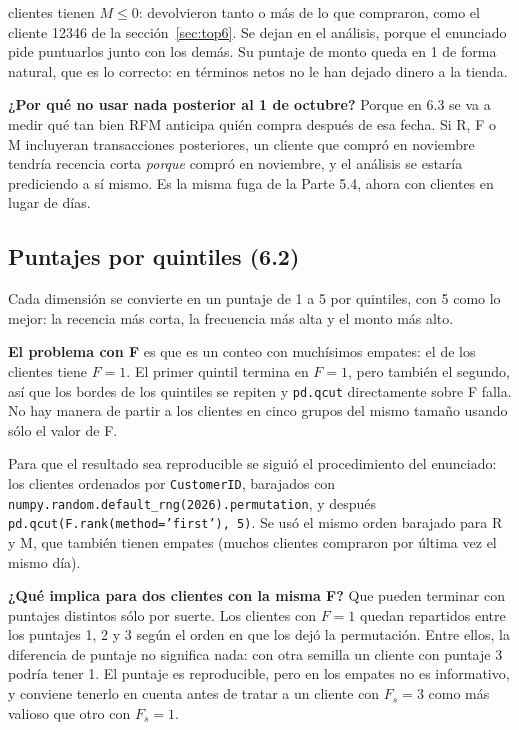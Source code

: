 \documentclass[11pt,letterpaper]{article}
\newcommand{\code}[1]{\texttt{#1}}
\newenvironment{respuesta}{\par\medskip}{\par\medskip}
\begin{document}
\ClientesMneg{} clientes tienen \textbf{$M\le0$}: devolvieron tanto o más de
lo que compraron, como el cliente 12346 de la sección~\ref{sec:top6}. Se
dejan en el análisis, porque el enunciado pide puntuarlos junto con los
demás. Su puntaje de monto queda en 1 de forma natural, que es lo correcto:
en términos netos no le han dejado dinero a la tienda.

\begin{respuesta}
\textbf{¿Por qué no usar nada posterior al 1 de octubre?} Porque en 6.3 se
va a medir qué tan bien RFM anticipa quién compra después de esa fecha. Si R,
F o M incluyeran transacciones posteriores, un cliente que compró en
noviembre tendría recencia corta \emph{porque} compró en noviembre, y el
análisis se estaría prediciendo a sí mismo. Es la misma fuga de la Parte
5.4, ahora con clientes en lugar de días.
\end{respuesta}

\subsection{Puntajes por quintiles (6.2)}

Cada dimensión se convierte en un puntaje de 1 a 5 por quintiles, con 5 como
lo mejor: la recencia más corta, la frecuencia más alta y el monto más alto.

\textbf{El problema con F} es que es un conteo con muchísimos empates: el
\FracFuno{} de los clientes tiene $F=1$. El primer quintil termina en $F=1$,
pero también el segundo, así que los bordes de los quintiles se repiten y
\code{pd.qcut} directamente sobre F falla. No hay manera de partir a los
clientes en cinco grupos del mismo tamaño usando sólo el valor de F.

Para que el resultado sea reproducible se siguió el procedimiento del
enunciado: los clientes ordenados por \code{CustomerID}, barajados con
\code{numpy.random.default\_rng(2026).permutation}, y después
\code{pd.qcut(F.rank(method='first'), 5)}. Se usó el mismo orden barajado
para R y M, que también tienen empates (muchos clientes compraron por última
vez el mismo día).

\begin{respuesta}
\textbf{¿Qué implica para dos clientes con la misma F?} Que pueden terminar
con puntajes distintos sólo por suerte. Los clientes con $F=1$ quedan
repartidos entre los puntajes 1, 2 y 3 según el orden en que los dejó la
permutación. Entre ellos, la diferencia de puntaje no significa nada: con
otra semilla un cliente con puntaje 3 podría tener 1. El puntaje es
reproducible, pero en los empates no es informativo, y conviene tenerlo en
cuenta antes de tratar a un cliente con $F_s=3$ como más valioso que otro con
$F_s=1$.
\end{respuesta}
\end{document}
